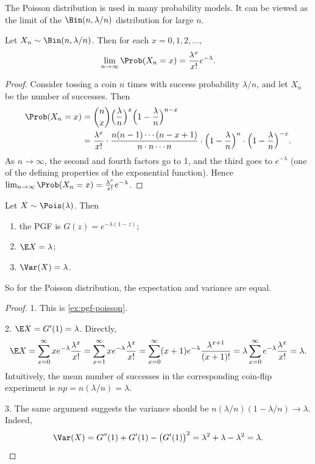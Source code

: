 The Poisson distribution is used in many probability models. It can be viewed as the limit of the $\Bin(n, \lambda/n)$ distribution for large $n$.

\begin{theorem}\label{thm:poisson-limit}
Let $X_n \sim \Bin(n, \lambda/n)$. Then for each $x = 0, 1, 2, \ldots$,
\[
  \lim_{n \to \infty} \Prob(X_n = x) = \frac{\lambda^x}{x!} e^{-\lambda}.
\]
\end{theorem}

\begin{proof}
Consider tossing a coin $n$ times with success probability $\lambda/n$, and let $X_n$ be the number of successes. Then
\begin{align*}
  \Prob(X_n = x) &= \binom{n}{x} \Bigl(\frac{\lambda}{n}\Bigr)^x \Bigl(1 - \frac{\lambda}{n}\Bigr)^{n-x} \\
  &= \frac{\lambda^x}{x!} \cdot \frac{n(n-1)\cdots(n-x+1)}{n \cdot n \cdots n} \cdot \Bigl(1 - \frac{\lambda}{n}\Bigr)^n \cdot \Bigl(1 - \frac{\lambda}{n}\Bigr)^{-x}.
\end{align*}
As $n \to \infty$, the second and fourth factors go to 1, and the third goes to $e^{-\lambda}$ (one of the defining properties of the exponential function). Hence $\lim_{n\to\infty} \Prob(X_n = x) = \frac{\lambda^x}{x!} e^{-\lambda}$.
\end{proof}

\begin{theorem}\label{thm:poisson-properties}
Let $X \sim \Pois(\lambda)$. Then
\begin{enumerate}
  \item the PGF is $G(z) = e^{-\lambda(1-z)}$;
  \item $\E X = \lambda$;
  \item $\Var(X) = \lambda$.
\end{enumerate}
So for the Poisson distribution, the expectation and variance are equal.
\end{theorem}

\begin{proof}
1. This is \cref{ex:pgf-poisson}.

2. $\E X = G'(1) = \lambda$. Directly,
\[
  \E X = \sum_{x=0}^\infty x e^{-\lambda} \frac{\lambda^x}{x!} = \sum_{x=1}^\infty x e^{-\lambda} \frac{\lambda^x}{x!} = \sum_{x=0}^\infty (x+1) e^{-\lambda} \frac{\lambda^{x+1}}{(x+1)!} = \lambda \sum_{x=0}^\infty e^{-\lambda} \frac{\lambda^x}{x!} = \lambda.
\]
Intuitively, the mean number of successes in the corresponding coin-flip experiment is $np = n(\lambda/n) = \lambda$.

3. The same argument suggests the variance should be $n(\lambda/n)(1 - \lambda/n) \to \lambda$. Indeed,
\[
  \Var(X) = G''(1) + G'(1) - \bigl(G'(1)\bigr)^2 = \lambda^2 + \lambda - \lambda^2 = \lambda. \qedhere
\]
\end{proof}


